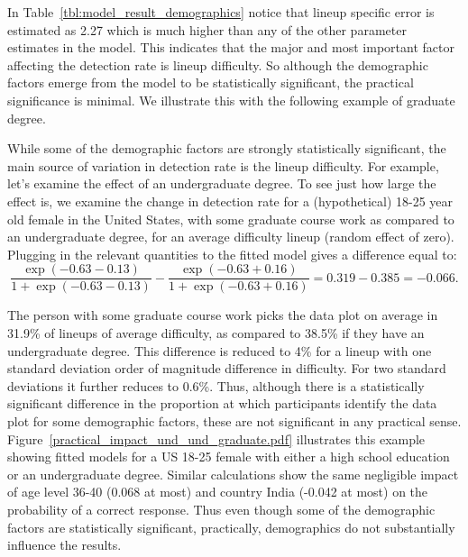 \documentclass[10pt]{article}\usepackage[]{graphicx}\usepackage[]{xcolor}
\begin{document}
In Table~\ref{tbl:model_result_demographics} notice that lineup specific error is estimated as 2.27 which is much higher than any of the other parameter estimates in the model. This indicates that the major and most important factor affecting the detection rate is  lineup difficulty.  So although the demographic factors emerge from the model to be statistically significant, the practical significance is minimal. We illustrate this with the following example of graduate degree.

While some of the demographic factors are strongly statistically significant, the main source of variation in detection rate is the lineup difficulty. For example, let's examine the effect of an undergraduate degree. To see just how large the effect is, we examine the change in detection rate for a (hypothetical) 18-25 year old female in the United States, with some graduate course work as compared to an undergraduate degree, for an average difficulty lineup (random effect of zero). Plugging in the relevant quantities to the fitted model gives a difference equal to:
$$ \frac {\exp(-0.63-0.13)}{1+\exp(-0.63-0.13)}-  \frac {\exp(-0.63+0.16)}{1+\exp(-0.63+0.16)} = 0.319- 0.385 =-0.066.$$ 

The person with some graduate course work picks the data plot  on average in 31.9\% of lineups of average difficulty, as compared to 38.5\% if they have an undergraduate degree. This difference is reduced to 4\% for a lineup with one standard deviation order of magnitude difference in difficulty. For two standard deviations it further reduces to 0.6\%. Thus, although there is a statistically significant difference in the proportion at which participants identify the  data plot for some demographic factors, these are not  significant in any practical sense.  Figure~\ref{practical_impact_und_und_graduate.pdf} illustrates this example showing fitted models for a US 18-25 female with either a high school education or an undergraduate degree.  Similar calculations show the same negligible impact of age level 36-40 (0.068 at most)  and country India (-0.042 at most) on the probability of a correct response. Thus even though some of the demographic factors are statistically significant, practically, demographics do not substantially influence the results. 
\end{document}
